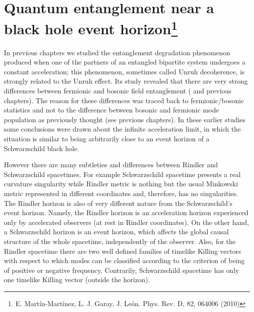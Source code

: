 
\chapter{Quantum entanglement near a black hole event horizon\footnote{E. Mart\'in-Mart\'inez, L. J. Garay, J. Le\'on. Phys. Rev. D, 82, 064006 (2010)}}\label{blackhole1}


In previous chapters we studied the entanglement degradation
phenomenon produced when one of the partners of an entangled bipartite
system undergoes a constant acceleration; this phenomenon, sometimes
called Unruh decoherence, is strongly related to the Unruh effect. Its
study revealed that there are very strong differences between fermionic
and bosonic field entanglement
(\!\!\cite{Alicefalls,AlsingSchul,Ditta,DiracDiscord} and previous chapters). The reason for these
differences  was traced back to fermionic/bosonic statistics and not to
the difference between bosonic and fermionic mode population as
previously thought (see previous chapters). In these earlier studies some
conclusions were drawn about the infinite acceleration limit, in which the
situation is similar to being arbitrarily close to an event horizon of a
Schwarzschild black hole.

However there are many subtleties and differences between Rindler and
Schwarzschild spacetimes. For example Schwarzschild spacetime
presents a real curvature singularity while Rindler metric is nothing but
the usual Minkowski metric represented in different coordinates and,
therefore, has no singularities. The Rindler horizon is also of very
different nature from the Schwarzschild's event horizon. Namely, the
Rindler horizon is an acceleration horizon experienced only by
accelerated observers (at rest in Rindler coordinates). On the other hand,
a Schwarzschild horizon is an event horizon, which affects the global
causal structure of the whole spacetime, independently of the observer.
Also, for the Rindler spacetime there are two well defined families of 
timelike Killing vectors with respect to which modes can be classified
according to the criterion of being of positive or negative frequency.
Contrarily, Schwarzschild spacetime has only one timelike Killing vector
(outside the horizon).

